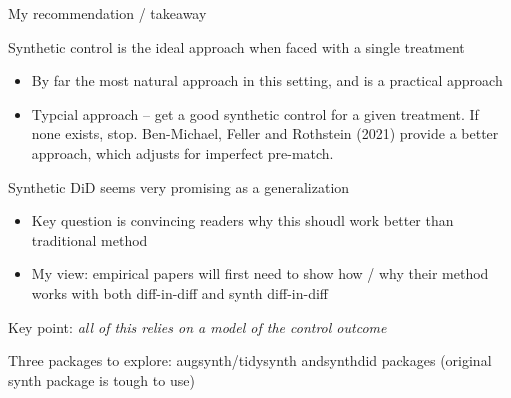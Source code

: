 \documentclass[notes,11pt, aspectratio=169]{beamer}
\newenvironment{wideitemize}{\itemize\addtolength{\itemsep}{10pt}}{\enditemize}
\begin{document}
\begin{frame}{My recommendation / takeaway}
  \begin{wideitemize}
  \item Synthetic control is the ideal approach when faced with a single treatment
    \begin{itemize}
    \item By far the most natural approach in this setting, and is a practical approach
    \item Typcial approach -- get a good synthetic control for a given
      treatment. If none exists, stop. Ben-Michael, Feller and
      Rothstein (2021) provide a better approach, which adjusts for
      imperfect pre-match.
    \end{itemize}
  \item Synthetic DiD seems very promising as a generalization
    \begin{itemize}
    \item Key question is convincing readers why this shoudl work better than traditional method
    \item My view: empirical papers will first need to show how / why
      their method works with both diff-in-diff and synth diff-in-diff
    \end{itemize}
  \item Key point: \emph{all of this relies on a model of the control outcome}
  \item Three packages to explore: augsynth/tidysynth andsynthdid
    packages (original synth package is tough to use)
  \end{wideitemize}
\end{frame}

\end{document}
